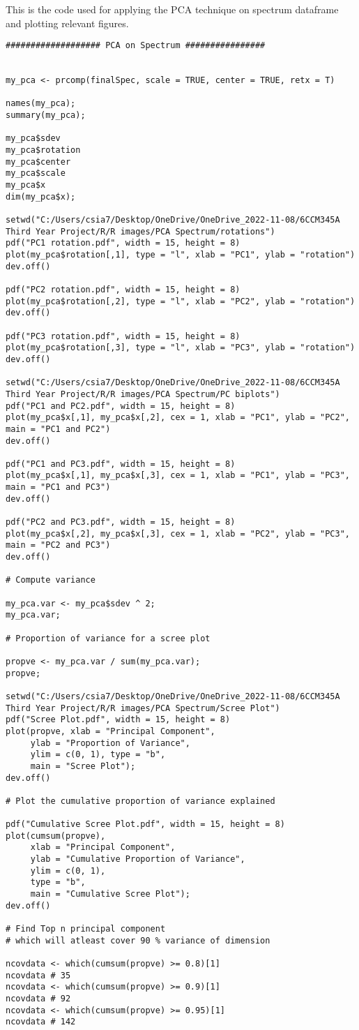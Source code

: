 This is the code used for applying the PCA technique on spectrum dataframe and plotting relevant figures.
\begin{verbatim}
################### PCA on Spectrum ################


my_pca <- prcomp(finalSpec, scale = TRUE, center = TRUE, retx = T)

names(my_pca);
summary(my_pca);

my_pca$sdev
my_pca$rotation
my_pca$center
my_pca$scale
my_pca$x
dim(my_pca$x);

setwd("C:/Users/csia7/Desktop/OneDrive/OneDrive_2022-11-08/6CCM345A Third Year Project/R/R images/PCA Spectrum/rotations")
pdf("PC1 rotation.pdf", width = 15, height = 8) 
plot(my_pca$rotation[,1], type = "l", xlab = "PC1", ylab = "rotation")
dev.off()

pdf("PC2 rotation.pdf", width = 15, height = 8) 
plot(my_pca$rotation[,2], type = "l", xlab = "PC2", ylab = "rotation")
dev.off()

pdf("PC3 rotation.pdf", width = 15, height = 8) 
plot(my_pca$rotation[,3], type = "l", xlab = "PC3", ylab = "rotation")
dev.off()

setwd("C:/Users/csia7/Desktop/OneDrive/OneDrive_2022-11-08/6CCM345A Third Year Project/R/R images/PCA Spectrum/PC biplots")
pdf("PC1 and PC2.pdf", width = 15, height = 8) 
plot(my_pca$x[,1], my_pca$x[,2], cex = 1, xlab = "PC1", ylab = "PC2", main = "PC1 and PC2")
dev.off()

pdf("PC1 and PC3.pdf", width = 15, height = 8) 
plot(my_pca$x[,1], my_pca$x[,3], cex = 1, xlab = "PC1", ylab = "PC3", main = "PC1 and PC3")
dev.off()

pdf("PC2 and PC3.pdf", width = 15, height = 8) 
plot(my_pca$x[,2], my_pca$x[,3], cex = 1, xlab = "PC2", ylab = "PC3", main = "PC2 and PC3")
dev.off()

# Compute variance

my_pca.var <- my_pca$sdev ^ 2;
my_pca.var;

# Proportion of variance for a scree plot

propve <- my_pca.var / sum(my_pca.var);
propve;

setwd("C:/Users/csia7/Desktop/OneDrive/OneDrive_2022-11-08/6CCM345A Third Year Project/R/R images/PCA Spectrum/Scree Plot")
pdf("Scree Plot.pdf", width = 15, height = 8) 
plot(propve, xlab = "Principal Component",
     ylab = "Proportion of Variance",
     ylim = c(0, 1), type = "b",
     main = "Scree Plot");
dev.off()

# Plot the cumulative proportion of variance explained

pdf("Cumulative Scree Plot.pdf", width = 15, height = 8) 
plot(cumsum(propve),
     xlab = "Principal Component",
     ylab = "Cumulative Proportion of Variance",
     ylim = c(0, 1), 
     type = "b",
     main = "Cumulative Scree Plot");
dev.off()

# Find Top n principal component
# which will atleast cover 90 % variance of dimension

ncovdata <- which(cumsum(propve) >= 0.8)[1] 
ncovdata # 35
ncovdata <- which(cumsum(propve) >= 0.9)[1] 
ncovdata # 92
ncovdata <- which(cumsum(propve) >= 0.95)[1] 
ncovdata # 142
\end{verbatim}

